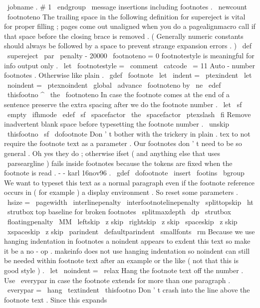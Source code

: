 {{{\
jobname
.
#
1
\
endgroup
}
\
message
{
insertions
}
%
including
footnotes
.
\
newcount
\
footnoteno
%
The
trailing
space
in
the
following
definition
for
supereject
is
%
vital
for
proper
filling
;
pages
come
out
unaligned
when
you
do
a
%
pagealignmacro
call
if
that
space
before
the
closing
brace
is
%
removed
.
(
Generally
numeric
constants
should
always
be
followed
by
a
%
space
to
prevent
strange
expansion
errors
.
)
\
def
\
supereject
{
\
par
\
penalty
-
20000
\
footnoteno
=
0
}
%
footnotestyle
is
meaningful
for
info
output
only
.
\
let
\
footnotestyle
=
\
comment
{
\
catcode
\
=
11
%
%
Auto
-
number
footnotes
.
Otherwise
like
plain
.
\
gdef
\
footnote
{
%
\
let
\
indent
=
\
ptexindent
\
let
\
noindent
=
\
ptexnoindent
\
global
\
advance
\
footnoteno
by
\
ne
\
edef
\
thisfootno
{
^
{
\
the
\
footnoteno
}
}
%
%
%
In
case
the
footnote
comes
at
the
end
of
a
sentence
preserve
the
%
extra
spacing
after
we
do
the
footnote
number
.
\
let
\
sf
\
empty
\
ifhmode
\
edef
\
sf
{
\
spacefactor
\
the
\
spacefactor
}
\
ptexslash
\
fi
%
%
Remove
inadvertent
blank
space
before
typesetting
the
footnote
number
.
\
unskip
\
thisfootno
\
sf
\
dofootnote
}
%
%
Don
'
t
bother
with
the
trickery
in
plain
.
tex
to
not
require
the
%
footnote
text
as
a
parameter
.
Our
footnotes
don
'
t
need
to
be
so
general
.
%
%
Oh
yes
they
do
;
otherwise
ifset
(
and
anything
else
that
uses
%
\
parseargline
)
fails
inside
footnotes
because
the
tokens
are
fixed
when
%
the
footnote
is
read
.
-
-
karl
16nov96
.
%
\
gdef
\
dofootnote
{
%
\
insert
\
footins
\
bgroup
%
We
want
to
typeset
this
text
as
a
normal
paragraph
even
if
the
%
footnote
reference
occurs
in
(
for
example
)
a
display
environment
.
%
So
reset
some
parameters
.
\
hsize
=
\
pagewidth
\
interlinepenalty
\
interfootnotelinepenalty
\
splittopskip
\
ht
\
strutbox
%
top
baseline
for
broken
footnotes
\
splitmaxdepth
\
dp
\
strutbox
\
floatingpenalty
\
MM
\
leftskip
\
z
skip
\
rightskip
\
z
skip
\
spaceskip
\
z
skip
\
xspaceskip
\
z
skip
\
parindent
\
defaultparindent
%
\
smallfonts
\
rm
%
%
Because
we
use
hanging
indentation
in
footnotes
a
noindent
appears
%
to
exdent
this
text
so
make
it
be
a
no
-
op
.
makeinfo
does
not
use
%
hanging
indentation
so
noindent
can
still
be
needed
within
footnote
%
text
after
an
example
or
the
like
(
not
that
this
is
good
style
)
.
\
let
\
noindent
=
\
relax
%
%
Hang
the
footnote
text
off
the
number
.
Use
\
everypar
in
case
the
%
footnote
extends
for
more
than
one
paragraph
.
\
everypar
=
{
\
hang
}
%
\
textindent
{
\
thisfootno
}
%
%
%
Don
'
t
crash
into
the
line
above
the
footnote
text
.
Since
this
%
expands
}}}}
